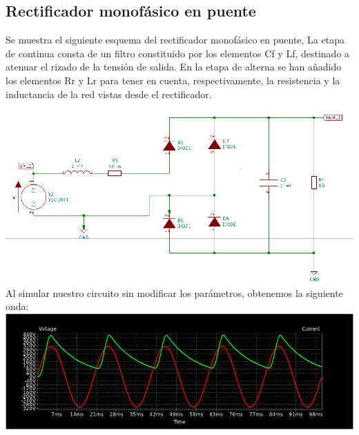 \documentclass[12pt,a4paper]{article}
\begin{document}
\subsection{Rectificador monofásico en puente}
\begin{flushleft}
Se muestra el siguiente esquema del rectificador monofásico en puente, La etapa de continua consta de un filtro constituido por los elementos Cf y Lf, destinado a atenuar el rizado de la tensión de salida. 
En la etapa de alterna se han añadido los elementos Rr y Lr para tener en cuenta, respectivamente, la resistencia y la inductancia de la red vistas desde el rectificador. 
\end{flushleft}
\begin{center}
\includegraphics[scale=0.7]{imagenes/p2/Circuito2.png} 
\\ Al simular nuestro circuito sin modificar los parámetros, obtenemos la siguiente onda:\\
\includegraphics[scale=0.5]{imagenes/p2/practica131.png} 
 

\end{center}
\end{document}
